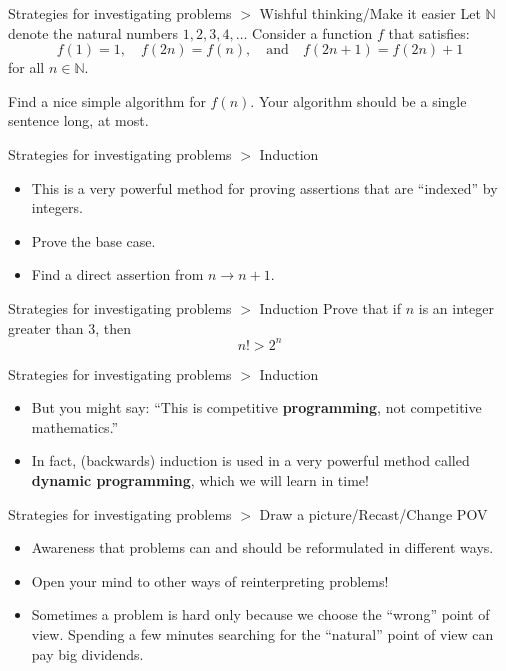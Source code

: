 \documentclass{beamer}
\begin{document}
\begin{frame}{Strategies for investigating problems $>$ Wishful thinking/Make it easier}
    Let $\mathbb{N}$ denote the natural numbers $1, 2, 3, 4, \dots$ Consider a function $f$ that satisfies:
    \[ f(1) = 1, \quad f(2n) = f(n), \quad \text{and} \quad f(2n + 1) = f(2n) + 1 \]
    for all $n \in \mathbb{N}$.
    \pause
    \vspace{0.8em}

    Find a nice simple algorithm for $f(n)$. Your algorithm should be a single sentence long, at most.
\end{frame}

\begin{frame}{Strategies for investigating problems $>$ Induction}
    \begin{itemize}
        \item This is a very powerful method for proving assertions that are ``indexed'' by integers.
        \pause
        \item Prove the base case.
        \pause
        \item Find a direct assertion from $n \to n + 1$.
    \end{itemize}
\end{frame}

\begin{frame}{Strategies for investigating problems $>$ Induction}
    Prove that if $n$ is an integer greater than 3, then
    \[ n! > 2^n \]
\end{frame}

\begin{frame}{Strategies for investigating problems $>$ Induction}
    \begin{itemize}
        \item But you might say: ``This is competitive \textbf{programming}, not competitive mathematics.''
        \pause
        \item In fact, (backwards) induction is used in a very powerful method called \textbf{dynamic programming}, which we will learn in time!
    \end{itemize}
\end{frame}

\begin{frame}{Strategies for investigating problems $>$ Draw a picture/Recast/Change POV}
    \begin{itemize}
        \item Awareness that problems can and should be reformulated in different ways.
        \pause
        \item Open your mind to other ways of reinterpreting problems!
        \pause
        \item Sometimes a problem is hard only because we choose the ``wrong'' point of view. Spending a few minutes searching for the ``natural'' point of view can pay big dividends.
    \end{itemize}
\end{frame}
\end{document}
